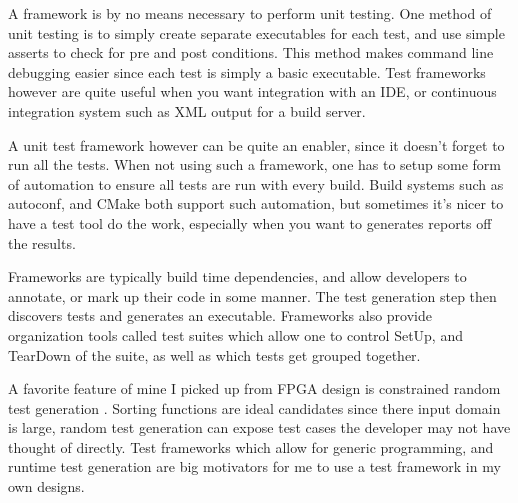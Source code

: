 \documentclass[12pt,journal]{article}
\begin{document}
A framework is by no means necessary to perform unit testing. One method of unit
testing is to simply create separate executables for each test, and use simple
asserts to check for pre and post conditions. This method makes command line
debugging easier since each test is simply a basic executable. Test frameworks
however are quite useful when you want integration with an IDE, or continuous
integration system such as XML output for a build server. 

A unit test framework however can be quite an enabler, since it doesn't forget
to run all the tests. When not using such a framework, one has to setup some
form of automation to ensure all tests are run with every build. Build systems
such as autoconf, and CMake both support such automation, but sometimes it's
nicer to have a test tool do the work, especially when you want to generates
reports off the results.

Frameworks are typically build time dependencies, and allow developers to
annotate, or mark up their code in some manner. The test generation step then
discovers tests and generates an executable.  Frameworks also provide
organization tools called test suites which allow one to control SetUp, and
TearDown of the suite, as well as which tests get grouped together.

A favorite feature of mine I picked up from FPGA design is constrained random
test generation \autocite{constrained}. Sorting functions are ideal candidates
since there input domain is large, random test generation can expose test cases
the developer may not have thought of directly.  Test frameworks which allow for
generic programming, and runtime test generation are big motivators for me to
use a test framework in my own designs.
\end{document}
